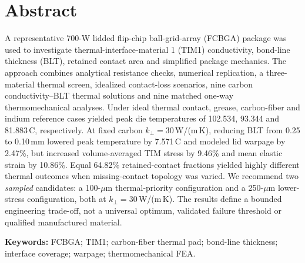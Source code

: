 \documentclass[10pt,a4paper]{article}
\begin{document}
\section*{Abstract}
\noindent\colorbox{pale}{\parbox{\dimexpr\linewidth-2\fboxsep\relax}{\small
A representative 700-W lidded flip-chip ball-grid-array (FCBGA) package was used
to investigate thermal-interface-material 1 (TIM1) conductivity, bond-line thickness
(BLT), retained contact area and simplified package mechanics. The approach combines
analytical resistance checks, numerical replication, a three-material thermal screen,
idealized contact-loss scenarios, nine carbon conductivity--BLT thermal solutions
and nine matched one-way thermomechanical analyses. Under ideal thermal contact,
grease, carbon-fiber and indium reference cases yielded peak die temperatures of
102.534, 93.344 and 81.883\,\textdegree C, respectively. At fixed carbon
$k_\perp=30$\,W/(m\,K), reducing BLT from 0.25 to 0.10\,mm lowered
peak temperature by 7.571\,\textdegree C and modeled lid warpage by 2.47\%,
but increased volume-averaged TIM stress by 9.46\% and mean elastic strain
by 10.86\%. Equal 64.82\% retained-contact fractions yielded highly different
thermal outcomes when missing-contact topology was varied. We recommend two
\emph{sampled} candidates: a 100-$\mu$m thermal-priority configuration
and a 250-$\mu$m lower-stress configuration, both at $k_\perp=30$\,W/(m\,K).
The results define a bounded engineering trade-off, not a universal optimum,
validated failure threshold or qualified manufactured material.}}\par
\vspace{2mm}
{\footnotesize\textbf{Keywords:} FCBGA; TIM1; carbon-fiber thermal pad; bond-line thickness;
interface coverage; warpage; thermomechanical FEA.}
\end{document}
